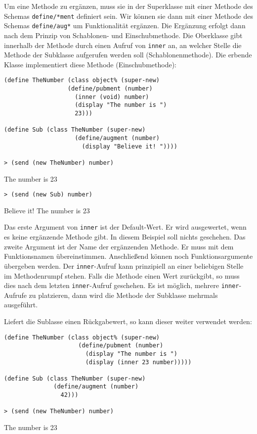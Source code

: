 Um eine Methode zu ergänzen, muss sie in der Superklasse mit einer Methode des Schemas \texttt{define/*ment} definiert sein. Wir können sie dann mit einer Methode des Schemas \texttt{define/aug*} um Funktionalität ergänzen. Die Ergänzung erfolgt dann nach dem Prinzip von Schablonen- und Einschubmethode. Die Oberklasse gibt innerhalb der Methode durch einen Aufruf von \texttt{inner} an, an welcher Stelle die Methode der Subklasse aufgerufen werden soll (Schablonenmethode). Die erbende Klasse implementiert diese Methode (Einschubmethode):

\begin{lstlisting}
(define TheNumber (class object% (super-new)
                  (define/pubment (number)
                    (inner (void) number)
                    (display "The number is ")
                    23)))

(define Sub (class TheNumber (super-new)
                    (define/augment (number)
                      (display "Believe it! "))))
                      
> (send (new TheNumber) number)
\end{lstlisting}
{\routput The number is 23}

\begin{lstlisting}                
> (send (new Sub) number)
\end{lstlisting}
{\routput Believe it! The number is 23}

Das erste Argument von \texttt{inner} ist der Default-Wert. Er wird ausgewertet, wenn es keine ergänzende Methode gibt. In diesem Beispiel soll nichts geschehen. Das zweite Argument ist der Name der ergänzenden Methode. Er muss mit dem Funktionsnamen übereinstimmen. Anschließend können noch Funktionsargumente übergeben werden. Der \texttt{inner}-Aufruf kann prinzipiell an einer beliebigen Stelle im Methodenrumpf stehen. Falls die Methode einen Wert zurückgibt, so muss dies nach dem letzten \texttt{inner}-Aufruf geschehen. Es ist möglich, mehrere \texttt{inner}-Aufrufe zu platzieren, dann wird die Methode der Subklasse mehrmals ausgeführt. 

Liefert die Sublasse einen Rückgabewert, so kann dieser weiter verwendet werden:

\begin{lstlisting}
(define TheNumber (class object% (super-new)
                     (define/pubment (number)
                       (display "The number is ")
                       (display (inner 23 number)))))

(define Sub (class TheNumber (super-new)
              (define/augment (number)
                42)))

> (send (new TheNumber) number)
\end{lstlisting}
{\routput The number is 23}

